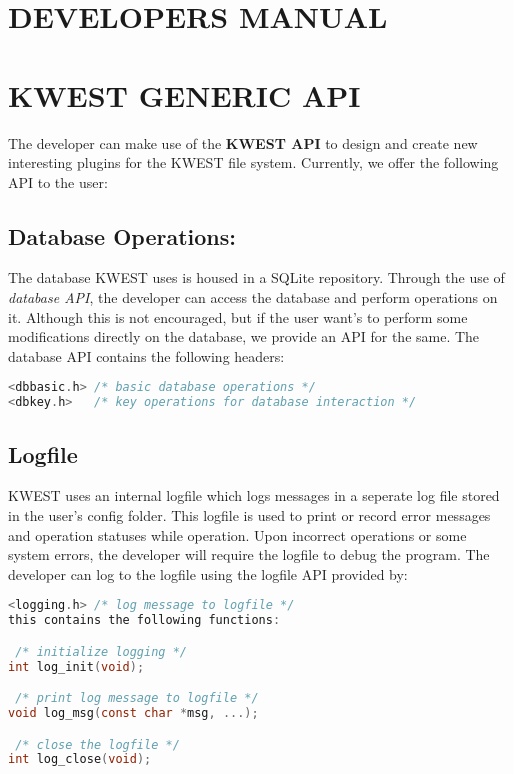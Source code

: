 \newpage

\setcounter{section}{0}
\section*{DEVELOPERS MANUAL}

\section {KWEST GENERIC API}
The developer can make use of the \textbf{KWEST API} to design and create new interesting plugins for the KWEST file system. Currently, we offer the following API to the user:

\subsection{Database Operations:}
The database KWEST uses is housed in a SQLite repository. Through the use of \textit{database API}, the developer can access the database and perform operations on it. Although this is not encouraged, but if the user want's to perform some modifications directly on the database, we provide an API for the same. The database API contains the following headers:
\begin{lstlisting}[language=C,frame=single]
<dbbasic.h> /* basic database operations */
<dbkey.h>   /* key operations for database interaction */
\end{lstlisting}

\subsection{Logfile}
KWEST uses an internal logfile which logs messages in a seperate log file stored in the user's config folder. This logfile is used to print or record error messages and operation statuses while operation. Upon incorrect operations or some system errors, the developer will require the logfile to debug the program. The developer can log to the logfile using the logfile API provided by:
\begin{lstlisting}[language=C,frame=single]
<logging.h> /* log message to logfile */
this contains the following functions:

 /* initialize logging */
int log_init(void); 

 /* print log message to logfile */
void log_msg(const char *msg, ...); 

 /* close the logfile */
int log_close(void);
\end{lstlisting}

